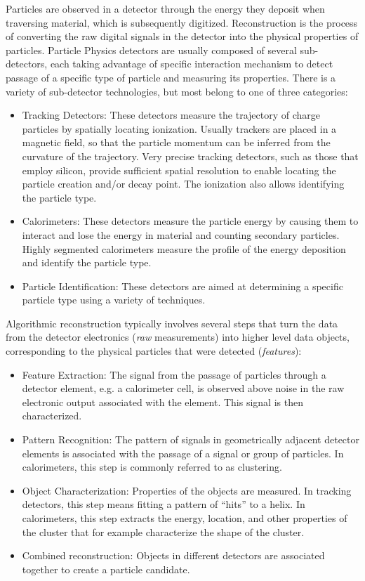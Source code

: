 Particles are observed in a detector through the energy they deposit when traversing material, which is subsequently digitized.
Reconstruction is the process of converting the raw digital signals in the detector into the physical properties of particles.
Particle Physics detectors are usually composed of several sub-detectors, each taking advantage of specific interaction mechanism to detect passage of a specific type of particle and measuring its properties. There is a variety of sub-detector technologies, but most belong to one of three categories:
\begin{itemize}
 \item Tracking Detectors: These detectors measure the trajectory of charge particles by spatially locating ionization. Usually trackers are placed in a magnetic field, so that the particle momentum can be inferred from the curvature of the trajectory. Very precise tracking detectors, such as those that employ silicon, provide  sufficient spatial resolution to enable locating the particle creation and/or decay point. The ionization also allows identifying the particle type.
 \item Calorimeters: These detectors measure the particle energy by causing them to interact and lose the energy in material and counting secondary particles. Highly segmented calorimeters measure the profile of the energy deposition and identify the particle type.
 \item Particle Identification: These detectors are aimed at determining a specific particle type using a variety of techniques.
\end{itemize}

Algorithmic reconstruction typically involves several steps that turn the data from the detector electronics (\emph{raw} measurements) into higher level data objects, corresponding to the physical particles that were detected (\emph{features}):
\begin{itemize}
 \item Feature Extraction: The signal from the passage of particles through a detector element, e.g. a calorimeter cell, is observed above noise in the raw electronic output associated with the element. This signal is then characterized.
 \item Pattern Recognition: The pattern of signals in geometrically adjacent detector elements is associated with the passage of a signal or group of particles. In calorimeters, this step is commonly referred to as clustering.
 \item Object Characterization: Properties of the objects are measured. In tracking detectors, this step means fitting a pattern of ``hits'' to a helix. In calorimeters, this step extracts the energy, location, and other properties of the cluster that for example characterize the shape of the cluster.
 \item Combined reconstruction: Objects in different detectors are associated together to create a particle candidate.
\end{itemize}

